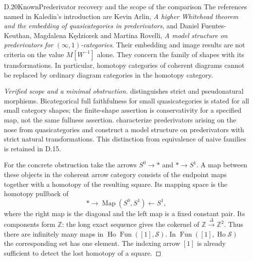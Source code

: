 \begin{result}{D.20}{Known}{Prederivator recovery and the scope of the comparison}
The references named in Kaledin's introduction are Kevin Arlin,
\emph{A higher Whitehead theorem and the embedding of
quasicategories in prederivators}, and Daniel Fuentes-Keuthan,
Magdalena K\k edziorek and Martina Rovelli,
\emph{A model structure on prederivators for $(\infty,1)$-categories}.
Their embedding and image results are not criteria on the value
$M[W^{-1}]$ alone. They concern the family of shapes with its
transformations. In particular, homotopy categories of coherent
diagrams cannot be replaced by ordinary diagram categories in the
homotopy category.
\end{result}
\begin{proof}[Verified scope and a minimal obstruction]
\citet[Theorems 19, 29 and 37]{DArlin2020} distinguishes strict
and pseudonatural morphisms. Bicategorical full faithfulness for
small quasicategories is stated for all small category shapes;
the finite-shape assertion is conservativity for a specified
map, not the same fullness assertion. \citet[Theorems 2.16, 3.1 and 3.4 in the arXiv version]{DFKR2019} characterize
prederivators arising on the nose from quasicategories and construct
a model structure on prederivators with strict natural
transformations. This distinction from equivalence of naive
families is retained in D.15.

For the concrete obstruction take the arrows $S^0\to *$ and
$*\to S^1$. A map between these objects in the coherent arrow
category consists of the endpoint maps together with a homotopy
of the resulting square. Its mapping space is the homotopy
pullback of
\[
 *\longrightarrow \operatorname{Map}(S^0,S^1)
                  \longleftarrow S^1,
\]
where the right map is the diagonal and the left map is a fixed
constant pair. Its components form $\mathbb Z$: the long exact
sequence gives the cokernel of
$\mathbb Z\xrightarrow{\Delta}\mathbb Z^2$.
Thus there are infinitely many maps in
$\operatorname{Ho}\operatorname{Fun}([1],\mathcal S)$.
In $\operatorname{Fun}([1],\operatorname{Ho}\mathcal S)$ the
corresponding set has one element. The indexing arrow $[1]$ is
already sufficient to detect the lost homotopy of a square.
\end{proof}

